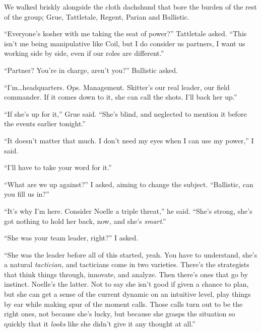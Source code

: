 We walked briskly alongside the cloth dachshund that bore the burden of the rest of the group; Grue, Tattletale, Regent, Parian and Ballistic.



``Everyone's kosher with me taking the seat of power?''  Tattletale asked. ``This isn't me being manipulative like Coil, but I do consider us partners, I want us working side by side, even if our roles are different.''



``Partner?  You're in charge, aren't you?'' Ballistic asked.



``I'm\ldots headquarters.  Ops.  Management.  Skitter's our real leader, our field commander.  If it comes down to it, she can call the shots.  I'll back her up.''



``If she's up for it,'' Grue said.  ``She's blind, and neglected to mention it before the events earlier tonight.''



``It doesn't matter that much.  I don't need my eyes when I can use my power,'' I said.



``I'll have to take your word for it.''



``What are we up against?'' I asked, aiming to change the subject.  ``Ballistic, can you fill us in?''



``It's why I'm here.  Consider Noelle a triple threat,'' he said.  ``She's strong, she's got nothing to hold her back, now, and she's \emph{smart}.''



``She was your team leader, right?'' I asked.



``She was the leader before all of this started, yeah.  You have to understand, she's a natural \emph{tactician, }and tacticians come in two varieties.  There's the strategists that think things through, innovate, and analyze.  Then there's ones that go by instinct.  Noelle's the latter.  Not to say she isn't good if given a chance to plan, but she can get a sense of the current dynamic on an intuitive level, play things by ear while making spur of the moment calls.  Those calls turn out to be the right ones, not because she's lucky, but because she grasps the situation so quickly that it \emph{looks }like she didn't give it any thought at all.''




